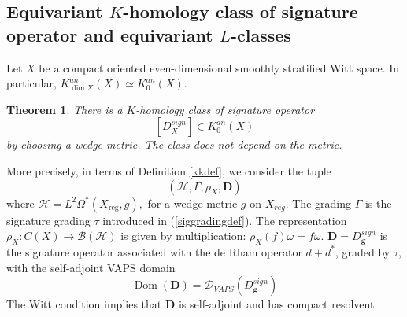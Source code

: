 \documentclass[11pt,leqno,twoside]{amsart}
\theoremstyle{plainsl}
\newtheorem{theorem}{Theorem}[section]
\theoremstyle{definition}
\newcommand{\bD}{\mathbf{D}}
\begin{document}
\subsection{Equivariant $K$-homology class of signature operator and equivariant  $L$-classes}

Let $X$ be a compact oriented even-dimensional  smoothly stratified Witt space. In particular, $K_{\dim X}^{an}(X)\simeq K_0^{an}(X)$.
\begin{theorem}
    \cite{ALMP} There is a $K$-homology class of signature operator $$\left[D_X^{sign}\right]\in K^{an}_0(X)$$ by choosing a wedge metric. The class does not depend on the metric.
\end{theorem}
More precisely, in terms of Definition
\ref{kkdef}, we consider the tuple
\begin{equation}\label{singaureclass}
    (\mathcal H,\Gamma,\rho_X,\bD)
\end{equation}
where
$
\mathcal H
=L^2\Omega^*(X_{\mathrm{reg}}, g),
$
for a   wedge metric $g$ on $X_{reg}$. The grading $\Gamma$ is the signature
grading $\tau$ introduced in (\ref{siggradingdef}). The representation
$
\rho_X:C(X)\longrightarrow\mathcal B(\mathcal H)
$
is given by multiplication:
$
\rho_X(f)\omega=f\omega.
$
 $\bD=D^{sign}_{\mathbf g}$ is
the signature operator associated with
the de Rham operator $d+d^*$, graded by
$\tau$, with the self-adjoint VAPS domain
\[
\operatorname{Dom}(\bD)
=\mathcal D_{VAPS}(D^{sign}_{\mathbf g})
\]
The Witt condition implies that $\bD$
is self-adjoint and has compact resolvent.
\end{document}
